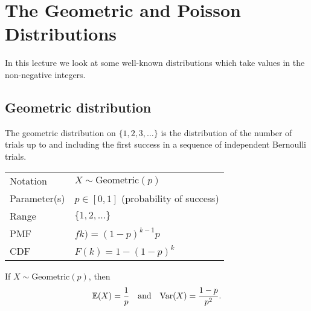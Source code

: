 \chapter{The Geometric and Poisson Distributions}\label{chap:geo-poisson}

In this lecture we look at some well-known distributions which take values in the non-negative integers.

\section{Geometric distribution}
The geometric distribution on $\{1,2,3,\ldots\}$ is the distribution of the number of trials up to and including the first success in a sequence of independent Bernoulli trials. 

\begin{center}
\begin{tabular}{ll}\hline
Notation			& $X\sim\text{Geometric}(p)$ \\
Parameter(s)	& $p \in[0,1]$ \quad (probability of success) \\
Range				& $\{1,2,\ldots\}$ \\
PMF				& $fk) = (1-p)^{k-1} p$\\ 
CDF				& $F(k) = 1-(1-p)^k$\\ \hline
\end{tabular}
\end{center}

\begin{lemma}
If $X\sim\text{Geometric}(p)$, then 
\[
\mathbb{E}(X)= \frac{1}{p} \quad\text{and}\quad \text{Var}(X) = \frac{1-p}{p^2}.
\]
\end{lemma}

